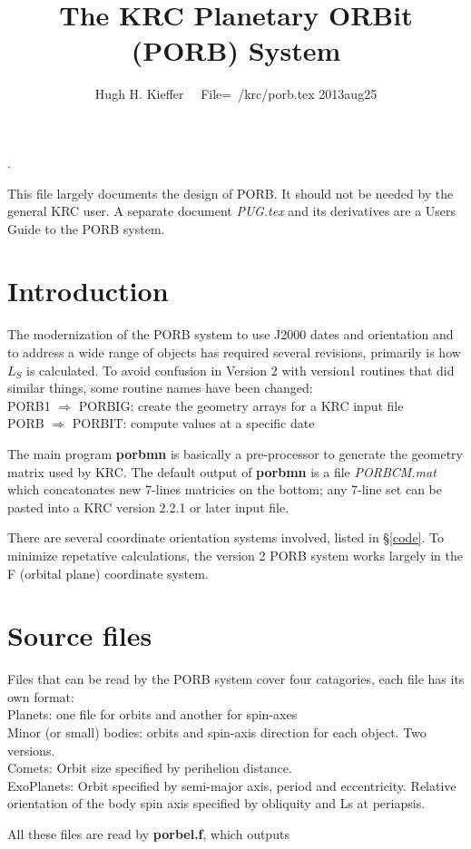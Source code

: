 \documentclass[draft]{article}
\title{The KRC Planetary ORBit (PORB) System}
\author{Hugh H. Kieffer  \ \ File=~/krc/porb.tex 2013aug25}
\newcommand{\qi}{\\ \hspace*{2.em}}      %
\newcommand{\np}{\textbf}  %
\newcommand{\nf}{\textit}  %
\begin{document}
\maketitle
\tableofcontents
\hrulefill .\hrulefill

This file largely documents the design of PORB. It should not be needed by
the general KRC user. A separate document \nf{PUG.tex} and its derivatives are a
Users Guide to the PORB system.

\section{Introduction} The modernization of the PORB system to use J2000 dates and orientation and to address a wide range of objects has required several revisions, primarily is how $L_S$ is calculated. To avoid confusion in Version 2 with version1 routines that did similar things, some routine names have been changed:
\qi PORB1 $\Rightarrow$ PORBIG: create the geometry arrays for a KRC input file 
\qi PORB $\Rightarrow$ PORBIT: compute values at a specific date 

The main program \np{porbmn} is basically a pre-processor to generate the
geometry matrix used by KRC. The default output of \np{porbmn} is a file
\nf{PORBCM.mat} which concatonates new 7-lines matricies on the bottom; any
7-line set can be pasted into a KRC version 2.2.1 or later input file.

There are several coordinate orientation systems involved, listed in \S \ref{code}. To minimize repetative calculations, the version 2 PORB system works largely in the F (orbital plane) coordinate system. 

\section{Source files} %
Files that can be read by the PORB system cover four catagories, each file has its own format:
\qi Planets:  one file for orbits and another for spin-axes
\qi Minor (or small) bodies: orbits and spin-axis direction for each object. Two versions.
\qi Comets: Orbit size specified by perihelion distance. 
\qi ExoPlanets: Orbit specified by semi-major axis, period and eccentricity. Relative orientation of the body spin axis specified by obliquity and Ls at periapsis.

All these files are read by \np{porbel.f}, which outputs 
\end{document}
